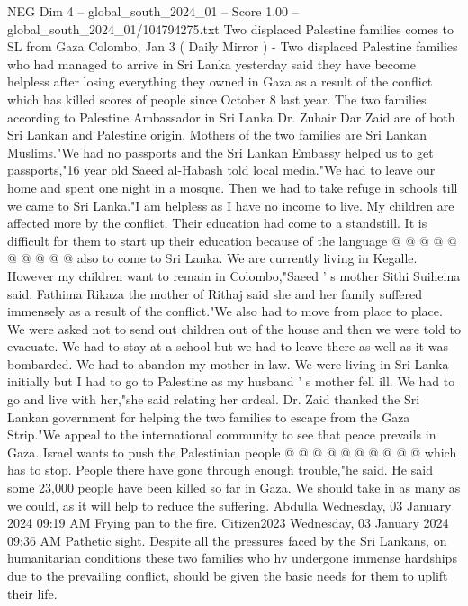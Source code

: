\begin{textsample}{NEG Dim 4 – global\_south\_2024\_01 – Score 1.00 – global\_south\_2024\_01/104794275.txt}  \label{ex:f4_neg_084}
Two displaced Palestine families comes to SL from Gaza Colombo, Jan 3 ( Daily Mirror ) - Two displaced Palestine families who had managed to arrive in Sri Lanka yesterday said they have become helpless after losing everything they owned in Gaza as a result of the conflict which has killed scores of people since October 8 last year.
The two families according to Palestine Ambassador in Sri Lanka Dr.
Zuhair Dar Zaid are of both Sri Lankan and Palestine origin.
Mothers of the two families are Sri Lankan Muslims."We had no passports and the Sri Lankan Embassy helped us to get passports,"16 year old Saeed al-Habash told local media."We had to leave our home and spent one night in a mosque.
Then we had to take refuge in schools till we came to Sri Lanka."I am helpless as I have no income to live.
My children are affected more by the conflict.
Their education had come to a standstill.
It is difficult for them to start up their education because of the language @ @ @ @ @ @ @ @ @ @ also to come to Sri Lanka.
We are currently living in Kegalle.
However my children want to remain in Colombo,"Saeed ' s mother Sithi Suiheina said.
Fathima Rikaza the mother of Rithaj said she and her family suffered immensely as a result of the conflict."We also had to move from place to place.
We were asked not to send out children out of the house and then we were told to evacuate.
We had to stay at a school but we had to leave there as well as it was bombarded.
We had to abandon my mother-in-law.
We were living in Sri Lanka initially but I had to go to Palestine as my husband ' s mother fell ill.
We had to go and live with her,"she said relating her ordeal.
Dr.
Zaid thanked the Sri Lankan government for helping the two families to escape from the Gaza Strip."We appeal to the international community to see that peace prevails in Gaza.
Israel wants to push the Palestinian people @ @ @ @ @ @ @ @ @ @ which has to stop.
People there have gone through enough trouble,"he said.
He said some 23,000 people have been killed so far in Gaza.
We should take in as many as we could, as it will help to reduce the suffering.
Abdulla Wednesday, 03 January 2024 09:19 AM Frying pan to the fire.
Citizen2023 Wednesday, 03 January 2024 09:36 AM Pathetic sight.
Despite all the pressures faced by the Sri Lankans, on humanitarian conditions these two families who hv undergone immense hardships due to the prevailing conflict, should be given the basic needs for them to uplift their life.

\end{textsample}
